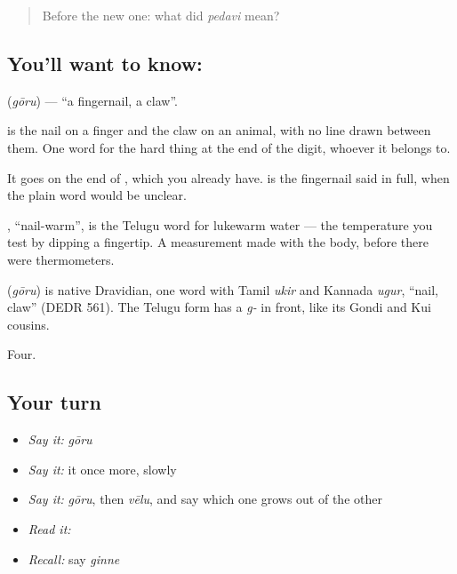 \begin{quote}
Before the new one: what did \emph{pedavi} mean?
\end{quote}

\subsection*{You'll want to know: }
\textbf{} (\emph{gōru}) — \textquotedblleft{}a fingernail, a claw\textquotedblright{}.

 is the nail on a finger and the claw on an animal, with no line drawn between them. One word for the hard thing at the end of the digit, whoever it belongs to.

It goes on the end of , which you already have.   is the fingernail said in full, when the plain word would be unclear.

, \textquotedblleft{}nail-warm\textquotedblright{}, is the Telugu word for lukewarm water — the temperature you test by dipping a fingertip. A measurement made with the body, before there were thermometers.

\begin{cousinweb}
\textbf{} (\emph{gōru}) is native Dravidian, one word with Tamil \emph{ukir} and Kannada \emph{ugur}, \textquotedblleft{}nail, claw\textquotedblright{} (DEDR 561). The Telugu form has a \emph{g-} in front, like its Gondi and Kui cousins.
\end{cousinweb}

\begin{grammarlens}[title={What you've built}]
Four.
\end{grammarlens}

\subsection*{Your turn}
\begin{itemize}
\raggedright
  \item \emph{Say it:} \emph{gōru}
  \item \emph{Say it:} it once more, slowly
  \item \emph{Say it:} \emph{gōru}, then \emph{vēlu}, and say which one grows out of the other
  \item \emph{Read it:} \textbf{}
  \item \emph{Recall:} say \emph{ginne}
\end{itemize}

